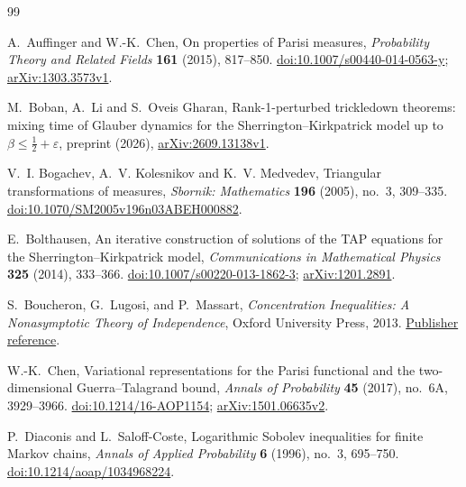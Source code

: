 \begin{thebibliography}{99}

A.~Auffinger and W.-K.~Chen,
\newblock On properties of Parisi measures,
\newblock \emph{Probability Theory and Related Fields}
\textbf{161} (2015), 817--850.
\newblock \href{https://doi.org/10.1007/s00440-014-0563-y}{doi:10.1007/s00440-014-0563-y};
\href{https://arxiv.org/abs/1303.3573v1}{arXiv:1303.3573v1}.

M.~Boban, A.~Li and S.~Oveis Gharan,
\newblock Rank-1-perturbed trickledown theorems: mixing time of Glauber
dynamics for the Sherrington--Kirkpatrick model up to
$\beta\leq\frac12+\varepsilon$,
\newblock preprint (2026),
\href{https://arxiv.org/abs/2609.13138v1}{arXiv:2609.13138v1}.

V.~I. Bogachev, A.~V. Kolesnikov and K.~V. Medvedev,
\newblock Triangular transformations of measures,
\newblock \emph{Sbornik: Mathematics} \textbf{196} (2005), no.~3, 309--335.
\newblock \href{https://doi.org/10.1070/SM2005v196n03ABEH000882}{doi:10.1070/SM2005v196n03ABEH000882}.

E.~Bolthausen,
\newblock An iterative construction of solutions of the TAP equations
for the Sherrington--Kirkpatrick model,
\newblock \emph{Communications in Mathematical Physics}
\textbf{325} (2014), 333--366.
\newblock \href{https://doi.org/10.1007/s00220-013-1862-3}{doi:10.1007/s00220-013-1862-3};
\href{https://arxiv.org/abs/1201.2891}{arXiv:1201.2891}.

S.~Boucheron, G.~Lugosi, and P.~Massart,
\newblock \emph{Concentration Inequalities: A Nonasymptotic Theory of Independence},
\newblock Oxford University Press, 2013.
\newblock \href{https://doi.org/10.1093/acprof:oso/9780199535255.001.0001}{Publisher reference}.

W.-K.~Chen,
\newblock Variational representations for the Parisi functional and
the two-dimensional Guerra--Talagrand bound,
\newblock \emph{Annals of Probability} \textbf{45} (2017),
no.~6A, 3929--3966.
\newblock \href{https://doi.org/10.1214/16-AOP1154}{doi:10.1214/16-AOP1154};
\href{https://arxiv.org/abs/1501.06635v2}{arXiv:1501.06635v2}.

P.~Diaconis and L.~Saloff-Coste,
\newblock Logarithmic Sobolev inequalities for finite Markov chains,
\newblock \emph{Annals of Applied Probability} \textbf{6} (1996),
no.~3, 695--750.
\newblock \href{https://doi.org/10.1214/aoap/1034968224}{doi:10.1214/aoap/1034968224}.


\end{thebibliography}
